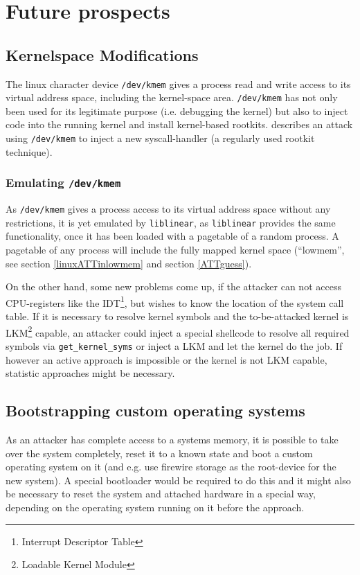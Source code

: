 %
%

\section{Future prospects}

\subsection{Kernelspace Modifications}

The linux character device \texttt{/dev/kmem} gives a process read and write
access to its virtual address space, including the kernel-space area.
\texttt{/dev/kmem} has not only been used for its legitimate purpose (i.e.
debugging the kernel) but also to inject code into the running kernel and
install kernel-based rootkits. \cite{phrack58.7:2001} describes an attack using
\texttt{/dev/kmem} to inject a new syscall-handler (a regularly used rootkit
technique).

\subsubsection{Emulating \texttt{/dev/kmem}}

As \texttt{/dev/kmem} gives a process access to its virtual address space
without any restrictions, it is yet emulated by \texttt{liblinear}, as
\texttt{liblinear} provides the same functionality, once it has been loaded with
a pagetable of a random process.  A pagetable of any process will include the
fully mapped kernel space (``lowmem'', see section \ref{linuxATTinlowmem} and
section \ref{ATTguess}).

On the other hand, some new problems come up, if the attacker can not access
CPU-registers like the IDT\footnote{Interrupt Descriptor Table}, but wishes to
know the location of the system call table. If it is necessary to resolve kernel
symbols and the to-be-attacked kernel is LKM\footnote{Loadable Kernel Module}
capable, an attacker could inject a special shellcode to resolve all required
symbols via \texttt{get\_kernel\_syms} or inject a LKM and let the kernel do the
job. If however an active approach is impossible or the kernel is not LKM
capable, statistic approaches might be necessary.

\subsection{Bootstrapping custom operating systems}

As an attacker has complete access to a systems memory, it is possible to take
over the system completely, reset it to a known state and boot a custom
operating system on it (and e.g. use firewire storage as the root-device for the
new system). A special bootloader would be required to do this and it might also
be necessary to reset the system and attached hardware in a special way,
depending on the operating system running on it before the approach.

